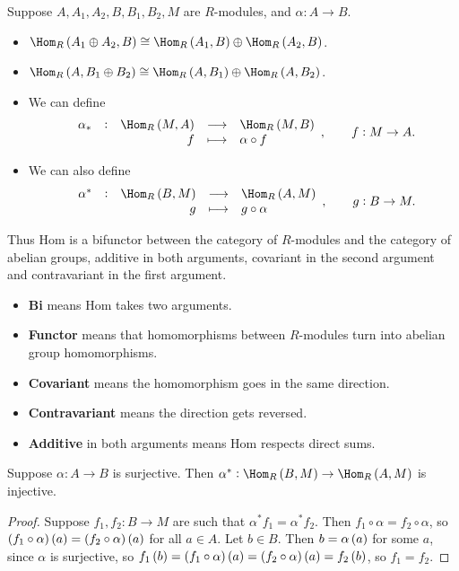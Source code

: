 \begin{proposition}
Suppose $ A, A_1, A_2, B, B_1, B_2, M $ are $ R $-modules, and $ \alpha : A \to B $.
\begin{itemize}
\item $ \Hom_R\br{A_1 \oplus A_2, B} \cong \Hom_R\br{A_1, B} \oplus \Hom_R\br{A_2, B} $.
\item $ \Hom_R\br{A, B_1 \oplus B_2} \cong \Hom_R\br{A, B_1} \oplus \Hom_R\br{A, B_2} $.
\item We can define
$$ \function[\alpha_*]{\Hom_R\br{M, A}}{\Hom_R\br{M, B}}{f}{\alpha \circ f}, \qquad f : M \to A. $$
\item We can also define
$$ \function[\alpha^*]{\Hom_R\br{B, M}}{\Hom_R\br{A, M}}{g}{g \circ \alpha}, \qquad g : B \to M. $$
\end{itemize}
\end{proposition}

Thus Hom is a bifunctor between the category of $ R $-modules and the category of abelian groups, additive in both arguments, covariant in the second argument and contravariant in the first argument.
\begin{itemize}
\item \textbf{Bi} means Hom takes two arguments.
\item \textbf{Functor} means that homomorphisms between $ R $-modules turn into abelian group homomorphisms.
\item \textbf{Covariant} means the homomorphism goes in the same direction.
\item \textbf{Contravariant} means the direction gets reversed.
\item \textbf{Additive} in both arguments means Hom respects direct sums.
\end{itemize}

\begin{proposition}
Suppose $ \alpha : A \to B $ is surjective. Then $ \alpha^* : \Hom_R\br{B, M} \to \Hom_R\br{A, M} $ is injective.
\end{proposition}

\begin{proof}
Suppose $ f_1, f_2 : B \to M $ are such that $ \alpha^*f_1 = \alpha^*f_2 $. Then $ f_1 \circ \alpha = f_2 \circ \alpha $, so $ \br{f_1 \circ \alpha}\br{a} = \br{f_2 \circ \alpha}\br{a} $ for all $ a \in A $. Let $ b \in B $. Then $ b = \alpha\br{a} $ for some $ a $, since $ \alpha $ is surjective, so $ f_1\br{b} = \br{f_1 \circ \alpha}\br{a} = \br{f_2 \circ \alpha}\br{a} = f_2\br{b} $, so $ f_1 = f_2 $.
\end{proof}

